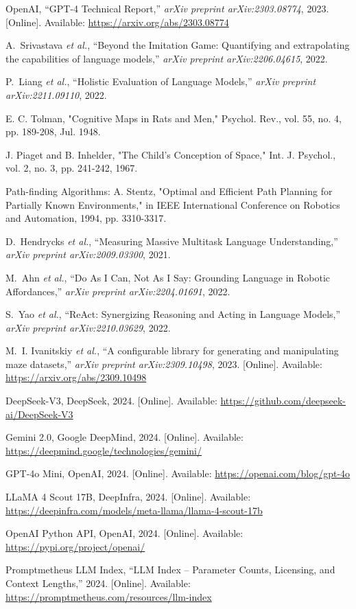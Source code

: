 \documentclass[conference]{IEEEtran}
\begin{document}
\begin{thebibliography}{00}

OpenAI, ``GPT-4 Technical Report,'' \emph{arXiv preprint arXiv:2303.08774}, 2023. [Online]. Available: \url{https://arxiv.org/abs/2303.08774}

A.~Srivastava \emph{et al.}, ``Beyond the Imitation Game: Quantifying and extrapolating the capabilities of language models,'' \emph{arXiv preprint arXiv:2206.04615}, 2022.

P.~Liang \emph{et al.}, ``Holistic Evaluation of Language Models,'' \emph{arXiv preprint arXiv:2211.09110}, 2022.

 E. C. Tolman, "Cognitive Maps in Rats and Men," Psychol. Rev., vol. 55, no. 4, pp. 189-208, Jul. 1948.

 J. Piaget and B. Inhelder, "The Child's Conception of Space," Int. J. Psychol., vol. 2, no. 3, pp. 241-242, 1967.

 Path-finding Algorithms: A. Stentz, "Optimal and Efficient Path Planning for Partially Known Environments," in IEEE International Conference on Robotics and Automation, 1994, pp. 3310-3317.

D.~Hendrycks \emph{et al.}, ``Measuring Massive Multitask Language Understanding,'' \emph{arXiv preprint arXiv:2009.03300}, 2021.

M.~Ahn \emph{et al.}, ``Do As I Can, Not As I Say: Grounding Language in Robotic Affordances,'' \emph{arXiv preprint arXiv:2204.01691}, 2022.

S.~Yao \emph{et al.}, ``ReAct: Synergizing Reasoning and Acting in Language Models,'' \emph{arXiv preprint arXiv:2210.03629}, 2022.

M.~I. Ivanitskiy \emph{et al.}, ``A configurable library for generating and manipulating maze datasets,'' \emph{arXiv preprint arXiv:2309.10498}, 2023. [Online]. Available: \url{https://arxiv.org/abs/2309.10498}

 DeepSeek-V3, DeepSeek, 2024. [Online]. Available: \url{https://github.com/deepseek-ai/DeepSeek-V3}

 Gemini 2.0, Google DeepMind, 2024. [Online]. Available: \url{https://deepmind.google/technologies/gemini/}

 GPT-4o Mini, OpenAI, 2024. [Online]. Available: \url{https://openai.com/blog/gpt-4o}

 LLaMA 4 Scout 17B, DeepInfra, 2024. [Online]. Available: \url{https://deepinfra.com/models/meta-llama/llama-4-scout-17b}

 OpenAI Python API, OpenAI, 2024. [Online]. Available: \url{https://pypi.org/project/openai/}

 Promptmetheus LLM Index, “LLM Index – Parameter Counts, Licensing, and Context Lengths,” 2024. [Online]. Available: \url{https://promptmetheus.com/resources/llm-index}


\end{thebibliography}
\end{document}
